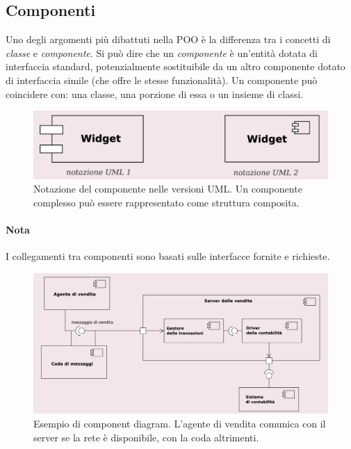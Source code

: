 \subsection{Componenti}

Uno degli argomenti più dibattuti nella POO è la differenza tra i concetti di \textit{classe} e \textit{componente}. Si può dire che un \textit{componente} è un'entità dotata di interfaccia standard, potenzialmente sostituibile da un altro componente dotato di interfaccia simile (che offre le stesse funzionalità). Un componente può coincidere con: una classe, una porzione di essa o un insieme di classi.

\begin{figure}[H]
    \centering
    \includegraphics[width=0.75\linewidth]{assets/UML/component/component-1.png}
    \caption{Notazione del componente nelle versioni UML. Un componente complesso può essere rappresentato come struttura composita.}
\end{figure}

\paragraph{Nota} I collegamenti tra componenti sono basati sulle interfacce fornite e richieste.

\begin{figure}[H]
    \centering
    \includegraphics[width=0.75\linewidth]{assets/UML/component/component-2.png}
    \caption{Esempio di component diagram. L'agente di vendita comunica con il server se la rete è disponibile, con la coda altrimenti.}
\end{figure}

\newpage